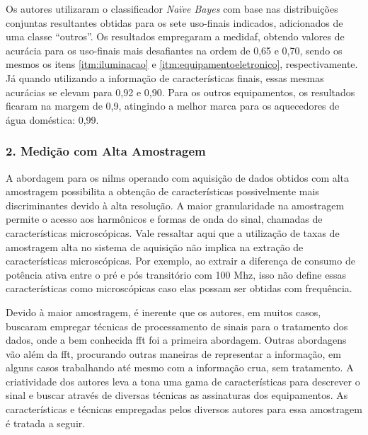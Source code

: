 \begin{enumerate}[label=\textbf{1.\arabic*},wide=\parindent]
Os autores utilizaram o classificador \emph{Naïve Bayes} com base nas
distribuições conjuntas resultantes obtidas para os sete uso-finais
indicados, adicionados de uma classe ``outros''.  Os resultados
empregaram a \acs{medidaf}, obtendo valores de acurácia para os
uso-finais mais desafiantes na ordem de 0,65 e 0,70, sendo os mesmos
os itens \ref{itm:iluminacao} e \ref{itm:equipamentoeletronico},
respectivamente. Já quando utilizando a informação de características
finais, essas mesmas acurácias se elevam para 0,92 e 0,90. Para os
outros equipamentos, os resultados ficaram na margem de 0,9, atingindo a
melhor marca para os aquecedores de água doméstica: 0,99.

\end{enumerate}

\subsubsection{2. Medição com Alta Amostragem}
\label{top:nilm_alta_am}

A abordagem para os \glspl{nilm} operando com aquisição de dados
obtidos com alta amostragem possibilita a obtenção de características
possivelmente mais discriminantes devido à alta resolução. A maior
granularidade na amostragem permite o acesso aos harmônicos e formas
de onda do sinal, chamadas de características microscópicas. Vale
ressaltar aqui que a utilização de taxas de amostragem alta no
sistema de aquisição não implica na extração de características
microscópicas. Por exemplo, ao extrair a diferença de consumo de
potência ativa entre o pré e pós transitório com 100 M\acs{hz},
isso não define essas características como microscópicas caso elas
possam ser obtidas com frequência.

Devido à maior amostragem, é inerente que os autores, em muitos casos,
buscaram empregar técnicas de processamento de sinais para o
tratamento dos dados, onde a bem conhecida \gls{fft} foi a primeira
abordagem. Outras abordagens vão além da \gls{fft}, procurando outras
maneiras de representar a informação, em alguns casos trabalhando até
mesmo com a informação crua, sem tratamento. A criatividade dos
autores leva a tona uma gama de características para descrever o sinal
e buscar através de diversas técnicas as assinaturas dos equipamentos. As
características e técnicas empregadas pelos diversos autores para essa
amostragem é tratada a seguir.

